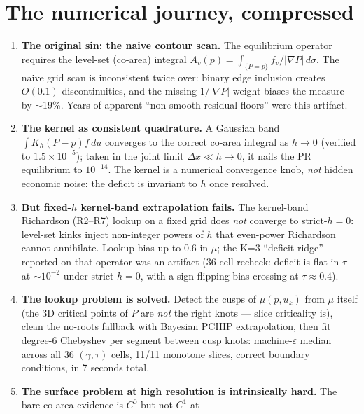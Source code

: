 \documentclass[11pt]{report}
\newcommand{\strict}{strict-$h{=}0$}
\begin{document}
\section*{The numerical journey, compressed}
\begin{enumerate}\itemsep2pt
  \item \textbf{The original sin: the naive contour scan.} The
        equilibrium operator requires the level-set (co-area) integral
        $A_v(p) = \int_{\{P = p\}} f_v / |\nabla P|\, d\sigma$. The
        naive grid scan is inconsistent twice over: binary edge
        inclusion creates $O(0.1)$ discontinuities, and the missing
        $1/|\nabla P|$ weight biases the measure by $\sim$19\%. Years
        of apparent ``non-smooth residual floors'' were this artifact.
  \item \textbf{The kernel as consistent quadrature.} A Gaussian band
        $\int K_h(P - p) f\, du$ converges to the correct co-area
        integral as $h \to 0$ (verified to $1.5 \times 10^{-5}$); taken
        in the joint limit $\Delta x \ll h \to 0$, it nails the PR
        equilibrium to $10^{-14}$. The kernel is a numerical
        convergence knob, \emph{not} hidden economic noise: the deficit
        is invariant to $h$ once resolved.
  \item \textbf{But fixed-$h$ kernel-band extrapolation fails.} The
        kernel-band Richardson (R2--R7) lookup on a fixed grid does
        \emph{not} converge to \strict{}: level-set kinks inject
        non-integer powers of $h$ that even-power Richardson cannot
        annihilate. Lookup bias up to 0.6 in $\mu$; the K=3
        ``deficit ridge'' reported on that operator was an artifact
        (36-cell recheck: deficit is flat in $\tau$ at $\sim 10^{-2}$
        under \strict{}, with a sign-flipping bias crossing at
        $\tau \approx 0.4$).
  \item \textbf{The lookup problem is solved.} Detect the cusps of
        $\mu(p, u_k)$ from $\mu$ itself (the 3D critical points of $P$
        are \emph{not} the right knots --- slice criticality is), clean
        the no-roots fallback with Bayesian PCHIP extrapolation, then
        fit degree-6 Chebyshev per segment between cusp knots:
        machine-$\varepsilon$ median across all 36 $(\gamma, \tau)$
        cells, 11/11 monotone slices, correct boundary conditions, in
        7 seconds total.
  \item \textbf{The surface problem at high resolution is intrinsically
        hard.} The bare co-area evidence is $C^0$-but-not-$C^1$ at

\end{enumerate}
\end{document}
